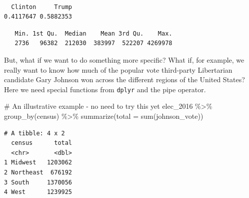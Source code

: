 \documentclass[
  letterpaper,
]{book}
\newenvironment{Shaded}{\begin{snugshade}}{\end{snugshade}}
\newcommand{\AttributeTok}[1]{\textcolor[rgb]{0.40,0.45,0.13}{#1}}
\newcommand{\CommentTok}[1]{\textcolor[rgb]{0.37,0.37,0.37}{#1}}
\newcommand{\FunctionTok}[1]{\textcolor[rgb]{0.28,0.35,0.67}{#1}}
\newcommand{\NormalTok}[1]{\textcolor[rgb]{0.00,0.23,0.31}{#1}}
\newcommand{\SpecialCharTok}[1]{\textcolor[rgb]{0.37,0.37,0.37}{#1}}
\begin{document}
\begin{Shaded}
\end{Shaded}

\begin{verbatim}

  Clinton     Trump 
0.4117647 0.5882353 
\end{verbatim}

\begin{Shaded}
\end{Shaded}

\begin{verbatim}
   Min. 1st Qu.  Median    Mean 3rd Qu.    Max. 
   2736   96382  212030  383997  522207 4269978 
\end{verbatim}

But, what if we want to do something more specific? What if, for
example, we really want to know how much of the popular vote third-party
Libertarian candidate Gary Johnson won across the different regions of
the United States? Here we need special functions from \texttt{dplyr}
and the pipe operator.

\begin{Shaded}
\begin{Highlighting}[]
\CommentTok{\# An illustrative example {-} no need to try this yet}
\NormalTok{elec\_2016 }\SpecialCharTok{\%\textgreater{}\%}
  \FunctionTok{group\_by}\NormalTok{(census) }\SpecialCharTok{\%\textgreater{}\%}
  \FunctionTok{summarize}\NormalTok{(}\AttributeTok{total =} \FunctionTok{sum}\NormalTok{(johnson\_vote))}
\end{Highlighting}
\end{Shaded}

\begin{verbatim}
# A tibble: 4 x 2
  census      total
  <chr>       <dbl>
1 Midwest   1203062
2 Northeast  676192
3 South     1370056
4 West      1239925
\end{verbatim}
\end{document}
